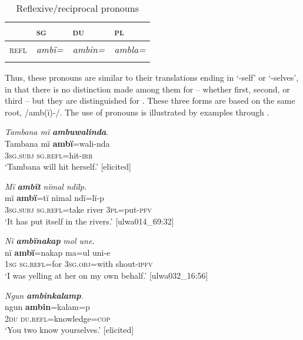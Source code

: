 \begin{table}
\caption{Reflexive/reciprocal pronouns}
\label{tab::6.4}
\begin{tabularx}{.7\textwidth}{lQQQ}
\lsptoprule
& {\scshape sg} & {\scshape du} & {\scshape pl}\\
\midrule
{\scshape refl} & {\itshape ambï=} & {\itshape ambin=} & {\itshape ambla=}\\
\lspbottomrule
\end{tabularx}
\end{table}
Thus, these pronouns are similar to their  translations ending in ‘-self’ or ‘-selves’, in that there is no distinction made among them for  -- whether first, second, or third -- but they are distinguished for . These three forms are based on the same root, /amb(ï)-/. The use of  pronouns is illustrated by examples  through .

\ea%
    \label{ex:pron:16}
          \textit{Tambana mï} \textbf{\textit{ambuwalinda}}.\\
\gll Tambana  mï      \textbf{ambï}=wali-nda\\
    [name]    3\textsc{sg.subj}  \textsc{sg.refl=}hit-\textsc{irr}\\
\glt `Tambana will hit herself.’ [elicited]
\z

\ea%
    \label{ex:pron:17}
          \textit{Mï} \textbf{\textit{ambït}} \textit{nïmal ndïlp.}\\
\gll    mï       \textbf{ambï}=tï    nïmal  ndï=lï-p\\
    3\textsc{sg.subj}  \textsc{sg.refl=}take  river  3\textsc{pl}=put-\textsc{pfv}\\
\glt `It has put itself in the rivers.’ [ulwa014\_69:32]
\z

\ea%
    \label{ex:pron:18}
          \textit{Nï} \textbf{\textit{ambïnakap}} \textit{mol une.}\\
\gll    nï     \textbf{ambï}=nakap  ma=ul      uni-e\\
    1\textsc{sg}  \textsc{sg.refl}=for  3\textsc{sg.obj}=with  shout-\textsc{ipfv}\\
\glt `I was yelling at her on my own behalf.’ [ulwa032\_16:56]
\z

\ea%
    \label{ex:pron:19}
          \textit{Ngun} \textbf{\textit{ambinkalamp}}.\\
\gll ngun  \textbf{ambin}=kalam=p\\
    2\textsc{du}  \textsc{du.refl=}knowledge=\textsc{cop}\\
\glt `You two know yourselves.’ [elicited]
\z

